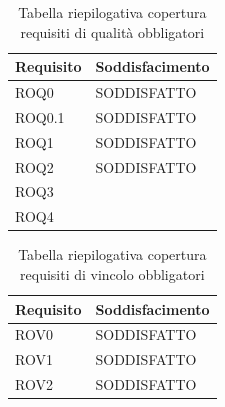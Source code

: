 \documentclass[openany,12pt,a4paper]{report}
\begin{document}
\begin{itemize}
\begin{longtable}{|p{40mm}|p{40mm}|p{40mm}|}
	\end{longtable}
	
	\begin{longtable}{|p{60mm}|p{60mm}|}
		\caption{Tabella riepilogativa copertura requisiti di qualità obbligatori} \\
		\hline
		\centering \textbf{Requisito} &  \textbf{Soddisfacimento}\\
		
		\hline \centering ROQ0 & SODDISFATTO \\
		\hline \centering ROQ0.1 & SODDISFATTO\\
		\hline \centering ROQ1 & SODDISFATTO\\
		\hline \centering ROQ2 & SODDISFATTO\\
		\hline \centering ROQ3 & \\
		\hline \centering ROQ4 & \\
		\hline
		
	\end{longtable}
	
	
	\begin{longtable}{|p{60mm}|p{60mm}|}
		\caption{Tabella riepilogativa copertura requisiti di vincolo obbligatori} \\
		\hline
		\centering \textbf{Requisito} &  \textbf{Soddisfacimento}\\
		
		\hline \centering ROV0 & SODDISFATTO \\
		\hline \centering ROV1 & SODDISFATTO\\
		\hline \centering ROV2 & SODDISFATTO\\
		\hline
		
	\end{longtable}
	

\end{itemize}
\end{document}
